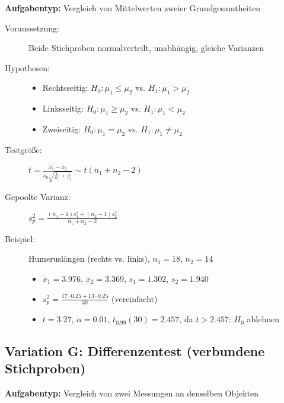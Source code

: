 \documentclass[12pt, a4paper, titlepage, ngerman]{scrartcl}
\begin{document}
\textbf{Aufgabentyp:} Vergleich von Mittelwerten zweier Grundgesamtheiten

\begin{description}
  \item[Voraussetzung:] Beide Stichproben normalverteilt, unabhängig, gleiche Varianzen
  \item[Hypothesen:] 
    \begin{itemize}
      \item Rechtsseitig: $H_0: \mu_1 \leq \mu_2$ vs. $H_1: \mu_1 > \mu_2$
      \item Linksseitig: $H_0: \mu_1 \geq \mu_2$ vs. $H_1: \mu_1 < \mu_2$
      \item Zweiseitig: $H_0: \mu_1 = \mu_2$ vs. $H_1: \mu_1 \neq \mu_2$
    \end{itemize}
  \item[Testgröße:] $t = \frac{\overline{x}_1 - \overline{x}_2}{s_p \sqrt{\frac{1}{n_1} + \frac{1}{n_2}}} \sim t(n_1 + n_2 - 2)$
  \item[Gepoolte Varianz:] $s_p^2 = \frac{(n_1-1)s_1^2 + (n_2-1)s_2^2}{n_1 + n_2 - 2}$
  \item[Beispiel:] Humeruslängen (rechts vs. links), $n_1 = 18$, $n_2 = 14$
    \begin{itemize}
      \item $\overline{x}_1 = 3.976$, $\overline{x}_2 = 3.369$, $s_1 = 1.302$, $s_2 = 1.940$
      \item $s_p^2 = \frac{17 \cdot 0.25 + 13 \cdot 0.25}{30}$ (vereinfacht)
      \item $t = 3.27$, $\alpha = 0.01$, $t_{0.99}(30) = 2.457$, da $t > 2.457$: $H_0$ ablehnen
    \end{itemize}
\end{description}

\subsection{Variation G: Differenzentest (verbundene Stichproben)}

\textbf{Aufgabentyp:} Vergleich von zwei Messungen an denselben Objekten
\end{document}
